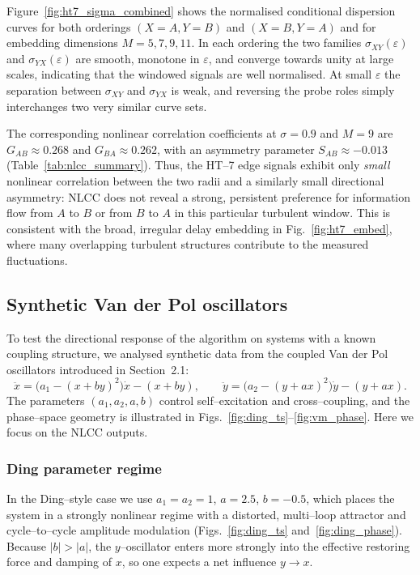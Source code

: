 \documentclass[12pt]{article}
\begin{document}
Figure~\ref{fig:ht7_sigma_combined} shows the normalised conditional
dispersion curves for both orderings $(X=A,Y=B)$ and $(X=B,Y=A)$ and for
embedding dimensions $M=5,7,9,11$.  In each ordering the two families
$\sigma_{XY}(\varepsilon)$ and $\sigma_{YX}(\varepsilon)$ are smooth,
monotone in $\varepsilon$, and converge towards unity at large scales,
indicating that the windowed signals are well normalised.  At small
$\varepsilon$ the separation between $\sigma_{XY}$ and $\sigma_{YX}$ is
weak, and reversing the probe roles simply interchanges two very similar
curve sets.

The corresponding nonlinear correlation coefficients at $\sigma=0.9$ and
$M=9$ are $G_{AB} \approx 0.268$ and $G_{BA} \approx 0.262$, with an
asymmetry parameter $S_{AB}\approx -0.013$
(Table~\ref{tab:nlcc_summary}).  Thus, the HT--7 edge signals exhibit
only \emph{small} nonlinear correlation between the two radii and a
similarly small directional asymmetry: NLCC does not reveal a strong,
persistent preference for information flow from $A$ to $B$ or from $B$
to $A$ in this particular turbulent window.  This is consistent with the
broad, irregular delay embedding in Fig.~\ref{fig:ht7_embed}, where many
overlapping turbulent structures contribute to the measured fluctuations.

\subsection{Synthetic Van der Pol oscillators}

To test the directional response of the algorithm on systems with a
known coupling structure, we analysed synthetic data from the coupled
Van der Pol oscillators introduced in Section~2.1:
\[
  \ddot x = \bigl(a_1 - (x + b y)^2\bigr)\dot x - (x + b y),\qquad
  \ddot y = \bigl(a_2 - (y + a x)^2\bigr)\dot y - (y + a x).
\]
The parameters $(a_1,a_2,a,b)$ control self–excitation and cross–coupling,
and the phase–space geometry is illustrated in
Figs.~\ref{fig:ding_ts}--\ref{fig:vm_phase}.  Here we focus on the NLCC
outputs.

\subsubsection*{Ding parameter regime}

In the Ding–style case we use $a_1=a_2=1$, $a=2.5$, $b=-0.5$, which
places the system in a strongly nonlinear regime with a distorted,
multi–loop attractor and cycle–to–cycle amplitude modulation
(Figs.~\ref{fig:ding_ts} and~\ref{fig:ding_phase}).  Because $|b|>|a|$,
the $y$–oscillator enters more strongly into the effective restoring
force and damping of $x$, so one expects a net influence $y\to x$.
\end{document}
